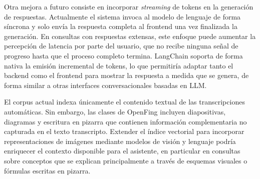 Otra mejora a futuro consiste en incorporar \textit{streaming} de tokens en la generación de respuestas. Actualmente el sistema invoca al modelo de lenguaje de forma síncrona y solo envía la respuesta completa al frontend una vez finalizada la generación. En consultas con respuestas extensas, este enfoque puede aumentar la percepción de latencia por parte del usuario, que no recibe ninguna señal de progreso hasta que el proceso completo termina. LangChain soporta de forma nativa la emisión incremental de tokens, lo que permitiría adaptar tanto el backend como el frontend para mostrar la respuesta a medida que se genera, de forma similar a otras interfaces conversacionales basadas en LLM.

El corpus actual indexa únicamente el contenido textual de las transcripciones automáticas. Sin embargo, las clases de OpenFing incluyen diapositivas, diagramas y escritura en pizarra que contienen información complementaria no capturada en el texto transcripto. Extender el índice vectorial para incorporar representaciones de imágenes mediante modelos de visión y lenguaje podría enriquecer el contexto disponible para el asistente, en particular en consultas sobre conceptos que se explican principalmente a través de esquemas visuales o fórmulas escritas en pizarra.


